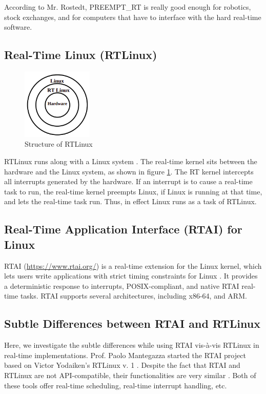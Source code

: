 \documentclass[12pt]{report}
\begin{document}
According to Mr. Rostedt, PREEMPT\_RT is really good enough for robotics, stock exchanges, and for computers that have to interface with the hard real-time software.


\subsection{Real-Time Linux (RTLinux)}

\begin{figure}[h]
\centering
\includegraphics[width=0.3\textwidth]{images/rtlinux.png}
\caption[Structure of RTLinux]{Structure of RTLinux \cite{NPTEL}}
\label{fig:rt-linux}
\end{figure}
RTLinux runs along with a Linux system \cite{embd-rtlinux}. The real-time kernel sits between the hardware and the Linux system, as shown in figure \ref{fig:rt-linux}. The RT kernel intercepts all interrupts generated by the hardware. If an interrupt is to cause a real-time task to run, the real-time kernel preempts Linux, if Linux is running at that time, and lets the real-time task run. Thus, in effect Linux runs as a task of RTLinux.

\subsection{Real-Time Application Interface (RTAI) for Linux}
RTAI (\url{https://www.rtai.org/}) is a real-time extension for the Linux kernel, which lets users write applications with strict timing constraints for Linux \cite{real-time-cap}. It provides a deterministic response to interrupts, POSIX-compliant, and native RTAI real-time tasks. RTAI supports several architectures, including x86-64, and ARM.

\subsection{Subtle Differences between RTAI and RTLinux}
Here, we investigate the subtle differences while using RTAI vis-\`a-vis RTLinux in real-time implementations. Prof. Paolo Mantegazza started the RTAI project based on Victor Yodaiken's RTLinux v. 1 \cite{embd-rtlinux}. Despite the fact that RTAI and RTLinux are not API-compatible, their functionalities are very similar \cite{rtai-linux-journal}. Both of these tools offer real-time scheduling, real-time interrupt handling, etc. \\
\end{document}
